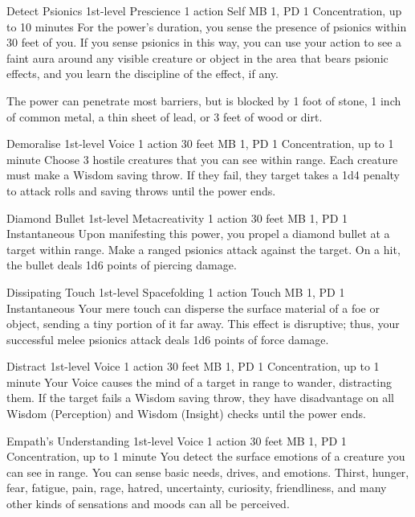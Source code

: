 \DndPowerHeader%
  {Detect Psionics}
  {1st-level Prescience}
  {1 action}
  {Self}
  {MB 1, PD 1}
  {Concentration, up to 10 minutes}
For the power's duration,
you sense the presence of psionics within 30 feet of you.
If you sense psionics in this way,
you can use your action to see a faint aura around
any visible creature or object in the area that bears psionic effects,
and you learn the discipline of the effect, if any.

The power can penetrate most barriers, but is blocked by
1 foot of stone,
1 inch of common metal,
a thin sheet of lead,
or 3 feet of wood or dirt.

\DndPowerHeader%
  {Demoralise}
  {1st-level Voice}
  {1 action}
  {30 feet}
  {MB 1, PD 1}
  {Concentration, up to 1 minute}
Choose 3 hostile creatures that you can see within range.
Each creature must make a Wisdom saving throw.
If they fail, they target takes a 1d4 penalty to attack rolls and
saving throws until the power ends.

\DndPowerHeader%
  {Diamond Bullet}
  {1st-level Metacreativity}
  {1 action}
  {30 feet}
  {MB 1, PD 1}
  {Instantaneous}
  Upon manifesting this power,
  you propel a diamond bullet at a target within range.
  Make a ranged psionics attack against the target.
  On a hit, the bullet deals 1d6 points of piercing damage.

\DndPowerHeader%
  {Dissipating Touch}
  {1st-level Spacefolding}
  {1 action}
  {Touch}
  {MB 1, PD 1}
  {Instantaneous}
Your mere touch can disperse the surface material of a foe or object,
sending a tiny portion of it far away.
This effect is disruptive; thus,
your successful melee psionics attack deals 1d6 points of force damage.

\DndPowerHeader%
  {Distract}
  {1st-level Voice}
  {1 action}
  {30 feet}
  {MB 1, PD 1}
  {Concentration, up to 1 minute}
Your Voice causes the mind of a target in range to wander,
distracting them.
If the target fails a Wisdom saving throw,
they have disadvantage on all Wisdom (Perception)
and Wisdom (Insight) checks until the power ends.

\DndPowerHeader%
  {Empath's Understanding}
  {1st-level Voice}
  {1 action}
  {30 feet}
  {MB 1, PD 1}
  {Concentration, up to 1 minute}
You detect the surface emotions of a creature you can see in range.
You can sense basic needs, drives, and emotions.
Thirst, hunger, fear, fatigue, pain, rage, hatred, uncertainty,
curiosity, friendliness, and many other kinds of sensations and moods
can all be perceived.

